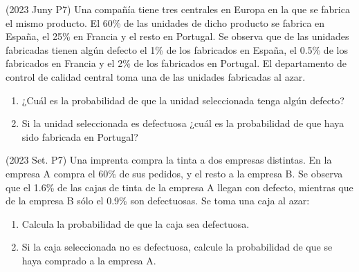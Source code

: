 
\item (2023 Juny P7) Una compañía tiene tres centrales en Europa en la que se fabrica el mismo producto. El 60\% de las unidades de dicho producto se fabrica en España, el 25\% en Francia y el resto en Portugal. Se observa que de las unidades fabricadas tienen algún defecto el 1\% de los fabricados en España, el 0.5\% de los fabricados en Francia y el 2\% de los fabricados en Portugal. El departamento de control de calidad central toma una de las unidades fabricadas al azar.
\begin{enumerate}
 \item ¿Cuál es la probabilidad de que la unidad seleccionada tenga algún defecto?
 \item Si la unidad seleccionada es defectuosa ¿cuál es la probabilidad de que haya sido fabricada en Portugal?
\end{enumerate}


\item (2023 Set. P7) Una imprenta compra la tinta a dos empresas distintas. En la empresa A compra el 60\% de sus pedidos, y el resto a la empresa B. Se observa que el 1.6\% de las cajas de tinta de la empresa A llegan con defecto, mientras que de la empresa B sólo el 0.9\% son defectuosas. Se toma una caja al azar:
\begin{enumerate}
 \item Calcula la probabilidad de que la caja sea defectuosa.
 \item Si la caja seleccionada no es defectuosa, calcule la probabilidad de que se haya comprado a la empresa A.
\end{enumerate}

